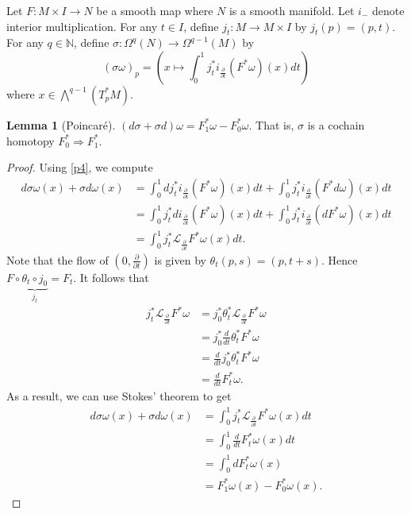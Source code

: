 \documentclass[10pt,letterpaper,cm]{nupset}
\theoremstyle{definition}
\theoremstyle{theorem}
\newtheorem{lemma}[definition]{Lemma}
\theoremstyle{remark}
\newcommand{\N}{\mathbb N}
\newcommand{\1}{\mathbb{1}}
\newcommand{\0}{\vec 0}
\begin{document}
\medskip

 Let $F: M \times I \to N$ be a smooth map where $N$ is a smooth manifold. Let $i_{{-}}$ denote interior multiplication. 
 For any $t\in I$, define $j_t: M \to M\times I$ by $j_t(p) = \left(p,t\right)$.
 For any $q\in \N$, define $\sigma  : \Omega^q(N) \to \Omega^{q-1}(M)$ by $$\left(\sigma{\omega}\right)_p = \left(x \mapsto \int_0^1 j_t^{\ast}i_{\frac{\partial}{\partial{t}}}(F^{\ast}{\omega})(x) dt\right)$$ where $x\in \bigwedge^{q-1}(T_p^{\ast}{M})$. 

\begin{lemma}[Poincar\'e]\label{Poin}
$\left(d\sigma + \sigma d\right)\omega = F_1^{\ast} \omega - F_0^{\ast}\omega$. That is, $\sigma$ is a cochain homotopy $F^{\ast}_0 \Rightarrow F^{\ast}_1$.
\end{lemma}
\begin{proof}
Using \cref{p4}, we compute
\begin{align*}
d\sigma \omega(x) + \sigma d \omega(x) & =  \int_0^1 dj_t^{\ast}i_{\frac{\partial}{\partial{t}}}(F^{\ast}{\omega})(x) dt + \int_0^1j_t^{\ast} i_{\frac{\partial}{\partial{t}}}(F^{\ast}{d\omega})(x) dt
\\ & =   \int_0^1 j_t^{\ast}di_{\frac{\partial}{\partial{t}}}(F^{\ast}{\omega})(x) dt + \int_0^1 j_t^{\ast}i_{\frac{\partial}{\partial{t}}}(dF^{\ast}{\omega})(x) dt
\\ & = \int_0^1 j_t^{\ast}\mathcal{L}_{\frac{\partial}{\partial{t}}}{F^{\ast}{\omega}}(x)dt
 . \end{align*} Note that the flow of $\left(0, \frac{\partial}{\partial{t}}\right)$ is given by $\theta_t(p,s) = \left(p, t+s\right)$. Hence $F \circ \underbrace{\theta_t \circ j_0}_{j_t} = F_t$. It follows that
\begin{align*}
j_t^{\ast}\mathcal{L}_{\frac{\partial}{\partial{t}}}{F^{\ast}{\omega}}
& = j_0^{\ast} \theta_t^{\ast}\mathcal{L}_{\frac{\partial}{\partial{t}}}{F^{\ast}{\omega}}
\\ & =  j_0^{\ast}\frac{d}{dt}\theta_t^{\ast}F^{\ast}\omega
\\ & = \frac{d}{dt}j_0^{\ast}\theta_t^{\ast}F^{\ast}\omega
\\ & = \frac{d}{dt}F_t^{\ast}{\omega}
. \end{align*}
 As a result, we can use Stokes' theorem to get
  \begin{align*}
d\sigma \omega(x) + \sigma d \omega(x) & =  \int_0^1 j_t^{\ast}\mathcal{L}_{\frac{\partial}{\partial{t}}}{F^{\ast}{\omega}}(x)dt
\\ & = \int_0^1 \frac{d}{dt}F_t^{\ast}{\omega}(x)dt
\\ & = \int_0^1 dF_t^{\ast}{\omega}(x)
\\ & = F^{\ast}_1{\omega}(x) - F^{\ast}_0{\omega}(x)
 . \end{align*}
\end{proof}
\end{document}
